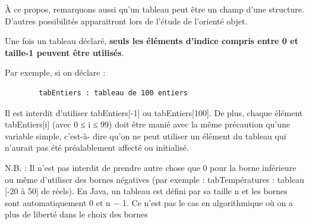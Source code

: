 \documentclass[11pt,a4paper]{article}
\begin{document}
            \par
        
        \`A ce propos, remarquons aussi qu'un tableau peut \^etre un
        champ d'une structure. D'autres possibilit\'es apparaitront lors de l'\'etude de l'orient\'e objet.
      
            \par
        
       Une fois un tableau d\'eclar\'e, \textbf{seuls les \'el\'ements d'indice
        compris entre 0 et taille-1 peuvent \^etre utilis\'es}. 
      
            \par
        
        Par exemple, si on d\'eclare :
      
            \par
        \begin{verbatim}
        tabEntiers : tableau de 100 entiers
      \end{verbatim}
        Il est interdit d'utiliser tabEntiers[-1] ou tabEntiers[100]. De plus, chaque \'el\'ement tabEntiers[i]
        (avec 0 ≤ i ≤ 99) doit \^etre mani\'e avec la m\^eme pr\'ecaution qu'une variable simple, c'est-\`a-
        dire qu'on ne peut utiliser un \'el\'ement du tableau qui n'aurait pas \'et\'e pr\'ealablement affect\'e
        ou initialis\'e.
      
            \par
        
        N.B. : Il n'est pas interdit de prendre autre chose que 0 pour la borne inf\'erieure ou m\^eme d'utiliser des
        bornes n\'egatives (par exemple : tabTemp\'eratures : tableau [-20 \`a 50] de r\'eels).
        En Java, un tableau est d\'efini par sa taille n et les bornes sont automatiquement 0 et n − 1.
        Ce n'est pas le cas en algorithmique o\`u on a plus de libert\'e dans le choix des bornes
      
\end{document}
